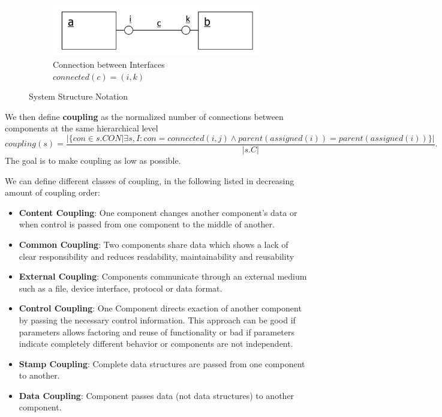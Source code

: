 \begin{figure}[h]
  \hspace{.03\textwidth}
  \begin{subfigure}{.3\textwidth}
    \centering
    \includegraphics[width=\textwidth]{images/component_connection.png}
    \caption{Connection between Interfaces\\ $connected(c) = (i,k)$}
  \end{subfigure}
  \caption{System Structure Notation}\label{fig:system_structure_notation}
\end{figure}

We then define \textbf{coupling} as the normalized number of connections between components at the same hierarchical level 
\begin{equation*}
  coupling(s) = \frac{|\{con \in s.CON| \exists s,I: con = connected(i,j) \wedge parent(assigned(i)) = parent(assigned(i))\}|}{|s.C|}.
\end{equation*}
The goal is to make coupling as low as possible.

We can define different classes of coupling, in the following listed in decreasing amount of coupling order:
\begin{itemize}
  \item \textbf{Content Coupling}: One component changes another component's data or when control is passed from one component to the middle of another.
  \item \textbf{Common Coupling}: Two components share data which shows a lack of clear responsibility and reduces readability, maintainability and reusability
  \item \textbf{External Coupling}: Components communicate through an external medium such as a file, device interface, protocol or data format.
  \item \textbf{Control Coupling}: One Component directs exaction of another component by passing the necessary control information. This approach can be good if parameters allows factoring and reuse of functionality or bad if parameters indicate completely different behavior or components are not independent.
  \item \textbf{Stamp Coupling}: Complete data structures are passed from one component to another.
  \item \textbf{Data Coupling}: Component passes data (not data structures) to another component.
\end{itemize}

